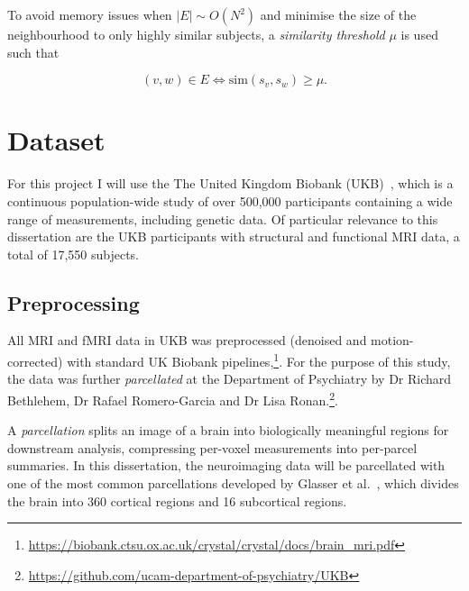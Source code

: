 To avoid memory issues when $|E| \sim O(N^2)$ and minimise the size of the neighbourhood to only highly similar subjects, a \textit{similarity threshold} $\mu$ is used such that

\begin{equation}
    (v, w) \in E \iff \mathrm{sim}(s_v, s_w) \geq \mu.
\end{equation}


\section{Dataset}
\label{dataset}

For this project I will use the The United Kingdom Biobank (UKB)~\cite{sudlow2015uk}, which is a continuous population-wide study of over 500,000 participants containing a wide range of measurements, including genetic data. Of particular relevance to this dissertation are the UKB participants with structural and functional MRI data, a total of 17,550 subjects. 


\subsection{Preprocessing}

All MRI and fMRI data in UKB was preprocessed (denoised and motion-corrected) with standard UK Biobank pipelines,\footnote{\url{https://biobank.ctsu.ox.ac.uk/crystal/crystal/docs/brain_mri.pdf}}. For the purpose of this study, the data was further \textit{parcellated} at the Department of Psychiatry by Dr Richard Bethlehem, Dr Rafael Romero-Garcia and Dr Lisa Ronan.\footnote{\url{https://github.com/ucam-department-of-psychiatry/UKB}}.

A \textit{parcellation} splits an image of a brain into biologically meaningful regions for downstream analysis, compressing per-voxel measurements into per-parcel summaries. In this dissertation, the neuroimaging data will be parcellated with one of the most common parcellations developed by Glasser et al.~\cite{glasser2016multi}, which divides the brain into 360 cortical regions and 16 subcortical regions. 


